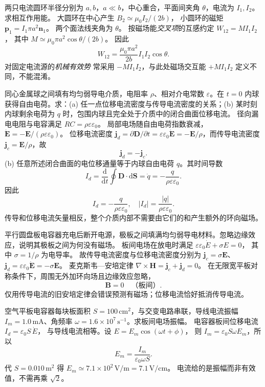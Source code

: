 两只电流圆环半径分别为 $a,b$，$a\ll b$，中心重合，平面间夹角 $\theta$，电流为 $I_1,I_2$。求相互作用能。
\exsolution
大圆环在中心产生
$B_2\simeq\mu_0I_2/(2b)$，
小圆环的磁矩
$\bm p_1=I_1\pi a^2\bm n_1$。
两个面法线夹角为 $\theta$。
按磁场能\emph{交叉项}的互感约定
$W_{12}=MI_1I_2$，
其中
$M\simeq\mu_0\pi a^2\cos\theta/(2b)$。
因此
\[
\boxed{W_{12}=\frac{\mu_0\pi a^2}{2b}
I_1I_2\cos\theta}.
\]
\excheck 对固定电流源的\emph{机械有效势}
常采用 $-MI_1I_2$，与此处磁场交互能 $+MI_1I_2$ 定义不同，不能混淆。

同心金属球之间填有均匀弱导电介质，电阻率 $\rho$、相对介电常数 $\varepsilon$。在 $t=0$ 内球获得自由电荷。求：(a) 任一点位移电流密度与传导电流密度的关系；(b) 某时刻内球剩余电荷为 $q$ 时，包围内球且完全处于介质中的闭合曲面位移电流。
\exsolution
径向漏电电阻与电容满足
$RC=\rho\varepsilon\varepsilon_0$。
局部电场随自由电荷指数衰减，
$\dot{\bm E}=-\bm E/(\rho\varepsilon\varepsilon_0)$。
位移电流密度
$\bm j_d=\partial\bm D/\partial t
=\varepsilon\varepsilon_0\dot{\bm E}
=-\bm E/\rho$，而传导电流密度
$\bm j_c=\bm E/\rho$，故
\[
\boxed{\bm j_d=-\bm j_c}.
\]
(b) 任意所述闭合曲面的电位移通量等于内球自由电荷 $q$。其时间导数
\[
I_d=\frac{\mathrm d}{\mathrm dt}\oint\bm D\cdot\mathrm d\bm S
=\dot q=-\frac q{\rho\varepsilon\varepsilon_0}.
\]
因此
\[
\boxed{I_d=-\frac q{\rho\varepsilon\varepsilon_0}},
\quad |I_d|=\frac{|q|}{\rho\varepsilon\varepsilon_0}.
\]
\excheck 传导和位移电流矢量相反，整个介质内部不需要由它们的和产生额外的环向磁场。

平行圆盘板电容器充电后断开电源，极板之间填满均匀弱导电材料。忽略边缘效应，说明其极板之间为何没有磁场。
\exsolution
板间电场在放电时满足
$\varepsilon\varepsilon_0\dot E+\sigma E=0$，
其中 $\sigma=1/\rho$ 为电导率。
故传导电流密度与位移电流密度分别为
$\bm j_c=\sigma\bm E$、
$\bm j_d=\varepsilon\varepsilon_0\dot{\bm E}
=-\sigma\bm E$。
麦克斯韦—安培定律
$\nabla\times\bm H=\bm j_c+\bm j_d=0$。
在无限宽平板对称条件下，周围无外加环向场且边缘效应忽略，
\[
\boxed{\bm B=0\quad\text{（板间）}}.
\]
\excheck 仅用传导电流的旧安培定律会错误预测有磁场；位移电流恰好抵消传导电流。

空气平板电容器每块板面积
$S=100\,\mathrm{cm^2}$，与交变电路串联，导线电流振幅 $I_m=1.0\,\mathrm{mA}$、角频率 $\omega=1.6\times10^7\,\mathrm{s^{-1}}$。求板间电场振幅。
\exsolution
电容器板间位移电流
$I_d=\varepsilon_0S\,\dot E$，
与导线电流相等。设
$E=E_m\cos(\omega t+\phi)$，
则
$I_m=\varepsilon_0S\omega E_m$，所以
\[
\boxed{E_m=\frac{I_m}{\varepsilon_0\omega S}}.
\]
代 $S=0.010\,\mathrm{m^2}$ 得
$\boxed{E_m\simeq7.1\times10^2\,\mathrm{V/m}
=7.1\,\mathrm{V/cm}}$。
\excheck 电流给的是振幅而非有效值，不需再乘 $\sqrt2$。

